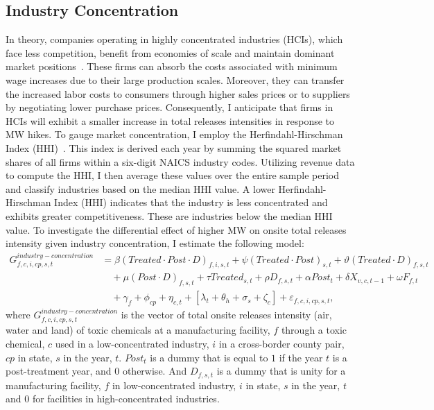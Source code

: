 \documentclass[12pt, english]{article}
\begin{document}
    \subsection{Industry Concentration}\label{subsec:industry-concentration}
    In theory, companies operating in highly concentrated industries (HCIs), which face less competition, benefit from economies of scale and maintain dominant market positions~\parencite{baumol1982contestable}. These firms can absorb the costs associated with minimum wage increases due to their large production scales. Moreover, they can transfer the increased labor costs to consumers through higher sales prices or to suppliers by negotiating lower purchase prices. Consequently, I anticipate that firms in HCIs will exhibit a smaller increase in total releases intensities in response to MW hikes. To gauge market concentration, I employ the Herfindahl-Hirschman Index (HHI)~\parencite{zhang2023unintended}. This index is derived each year by summing the squared market shares of all firms within a six-digit NAICS industry codes. Utilizing revenue data to compute the HHI, I then average these values over the entire sample period and classify industries based on the median HHI value. A lower Herfindahl-Hirschman Index (HHI) indicates that the industry is less concentrated and exhibits greater competitiveness. These are industries below the median HHI value. To investigate the differential effect of higher MW on onsite total releases intensity given industry concentration, I estimate the following model:
    \begin{align}
        G_{f,c,i,cp,s,t}^{industry-concentration} &= \beta (Treated \cdot Post \cdot D)_{f,i,s,t} + \psi (Treated \cdot Post)_{s,t} + \vartheta (Treated \cdot D)_{f,s,t} \nonumber \\
        &\quad + \mu (Post \cdot D)_{f,s,t} + \tau Treated_{s,t} + \rho D_{f,s,t} + \alpha Post_{t} + \delta X_{v,c,t-1} + \omega F_{f,t} \nonumber \\
        &\quad + \gamma_{f} + \phi_{cp} + \eta_{c,t} + \left[\lambda_{t} + \theta_{h} + \sigma_{s} + \zeta_{c} \right] + \varepsilon_{f,c,i,cp,s,t},\label{eq:heterogeneous-onsite-releases-intensity-lcis}
    \end{align}
    where $G_{f,c,i,cp,s,t}^{industry-concentration}$ is the vector of total onsite releases intensity (air, water and land) of toxic chemicals at a manufacturing facility, $f$ through a toxic chemical, $c$ used in a low-concentrated industry, $i$ in a cross-border county pair, $cp$ in state, $s$ in the year, $t$. $Post_{t}$ is a dummy that is equal to $1$ if the year $t$ is a post-treatment year, and $0$ otherwise. And $D_{f,s,t}$ is a dummy that is unity for a manufacturing facility, $f$ in low-concentrated industry, $i$ in state, $s$ in the year, $t$ and $0$ for facilities in high-concentrated industries.
    
\end{document}
